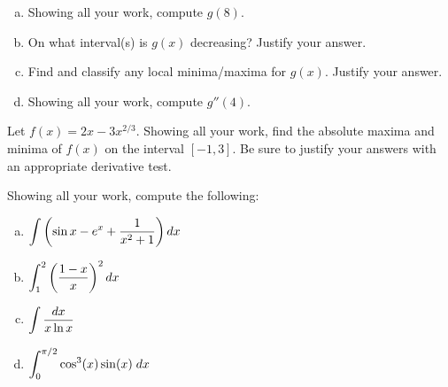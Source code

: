 \documentclass[12pt,letterpaper]{exam}
\begin{document}
\begin{questions}
\begin{enumerate}[(a)]
\item Showing all your work, compute $g(8)$. \vfill
\item On what interval(s) is $g(x)$ decreasing? Justify your answer. \vfill
\item Find and classify any local minima/maxima for $g(x)$. Justify your answer. \vfill
\item Showing all your work, compute $g''(4)$. \vfill
\end{enumerate}



\newpage
{} \par\vspace{0.3cm}

Let $f(x)= 2x - 3x^{2/3}$. Showing all your work, find the absolute maxima and minima of $f(x)$ on the interval $[-1, 3]$. Be sure to justify your answers with an appropriate derivative test. 



\newpage
{} \par\vspace{0.3cm}

Showing all your work, compute the following: \par\vspace{0.2cm}
	\begin{enumerate}[(a)]
	\item $\displaystyle\int \left( \sin x - e^x + \dfrac{1}{x^2 + 1} \right) dx$ \vfill
	\item $\displaystyle\int_1^2 \left( \dfrac{1 - x}{x} \right)^2 dx$ \vfill
	
	\newpage
	
	\item $\displaystyle\int \dfrac{dx}{x \ln x}$ \vfill
	\item $\displaystyle\int_0^{\pi/2} \cos^3(x) \sin(x) \;dx$ \vfill
	\end{enumerate}

\end{questions}
\end{document}
